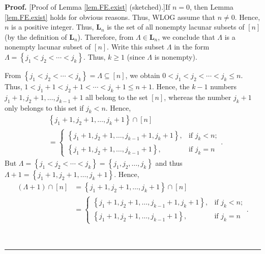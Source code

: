 \documentclass[numbers=enddot,12pt,final,onecolumn,notitlepage]{scrartcl}%
\theoremstyle{definition}
\newenvironment{proof}[1][Proof]{\noindent\textbf{#1.} }{\ \rule{0.5em}{0.5em}}
\newenvironment{vershort}{}{}
\begin{document}
\begin{vershort}
\begin{proof}
[Proof of Lemma \ref{lem.FE.exist} (sketched).]If $n=0$, then Lemma
\ref{lem.FE.exist} holds for obvious reasons. Thus, WLOG assume that $n\neq0$.
Hence, $n$ is a positive integer. Thus, $\mathbf{L}_{n}$ is the set of all
nonempty lacunar subsets of $\left[  n\right]  $ (by the definition of
$\mathbf{L}_{n}$). Therefore, from $\Lambda\in\mathbf{L}_{n}$, we conclude
that $\Lambda$ is a nonempty lacunar subset of $\left[  n\right]  $. Write
this subset $\Lambda$ in the form $\Lambda=\left\{  j_{1}<j_{2}<\cdots
<j_{k}\right\}  $. Thus, $k\geq1$ (since $\Lambda$ is nonempty).

From $\left\{  j_{1}<j_{2}<\cdots<j_{k}\right\}  =\Lambda\subseteq\left[
n\right]  $, we obtain $0<j_{1}<j_{2}<\cdots<j_{k}\leq n$. Thus,
$1<j_{1}+1<j_{2}+1<\cdots<j_{k}+1\leq n+1$. Hence, the $k-1$ numbers
$j_{1}+1,j_{2}+1,\ldots,j_{k-1}+1$ all belong to the set $\left[  n\right]  $,
whereas the number $j_{k}+1$ only belongs to this set if $j_{k}<n$. Hence,%
\begin{align*}
& \left\{  j_{1}+1,j_{2}+1,\ldots,j_{k}+1\right\}  \cap\left[  n\right]  \\
& =%
\begin{cases}
\left\{  j_{1}+1,j_{2}+1,\ldots,j_{k-1}+1,j_{k}+1\right\}  , & \text{if }%
j_{k}<n;\\
\left\{  j_{1}+1,j_{2}+1,\ldots,j_{k-1}+1\right\}  , & \text{if }j_{k}=n
\end{cases}
.
\end{align*}
But $\Lambda=\left\{  j_{1}<j_{2}<\cdots<j_{k}\right\}  =\left\{  j_{1}%
,j_{2},\ldots,j_{k}\right\}  $ and thus \newline$\Lambda+1=\left\{
j_{1}+1,j_{2}+1,\ldots,j_{k}+1\right\}  $. Hence,%
\begin{align}
\left(  \Lambda+1\right)  \cap\left[  n\right]    & =\left\{  j_{1}%
+1,j_{2}+1,\ldots,j_{k}+1\right\}  \cap\left[  n\right]  \nonumber\\
& =%
\begin{cases}
\left\{  j_{1}+1,j_{2}+1,\ldots,j_{k-1}+1,j_{k}+1\right\}  , & \text{if }%
j_{k}<n;\\
\left\{  j_{1}+1,j_{2}+1,\ldots,j_{k-1}+1\right\}  , & \text{if }j_{k}=n
\end{cases}
.\label{pf.lem.FE.exist.short.2}%
\end{align}



\end{proof}
\end{vershort}
\end{document}
